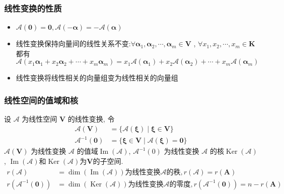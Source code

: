 \documentclass{article}
\begin{document}
			\subsubsection{线性变换的性质}
				\begin{itemize}
					\item $\mathscr{A}(\mathbf{0})=\mathbf{0}, \mathscr{A}(-\boldsymbol \alpha)=-\mathscr{A}(\boldsymbol{\alpha})$
					\item 线性变换保持向量间的线性关系不变:$\forall\boldsymbol{\alpha}_{1}, \boldsymbol{\alpha}_{2}, \cdots, \boldsymbol{\alpha}_{m} \in \boldsymbol V$ , $\forall x_{1}, x_{2}, \cdots, x_{m} \in \mathbf K$ 都有
					$$
					\mathscr{A}\left(x_{1} \boldsymbol{\alpha}_{1}+x_{2} \boldsymbol{\alpha}_{2}+\cdots+x_{m} \boldsymbol{\alpha}_{m}\right)=x_{1} \mathscr{A}\left(\boldsymbol{\alpha}_{1}\right)+x_{2} \mathscr{A}\left(\boldsymbol{\alpha}_{2}\right)+\cdots+x_{m} \mathscr{A}\left(\boldsymbol{\alpha}_{m}\right)
					$$
					\item 线性变换将线性相关的向量组变为线性相关的向量组
				\end{itemize}
			\subsubsection{线性空间的值域和核}
				设 $\mathscr{A}$ 为线性空间 $\boldsymbol V$ 的线性变换, 令
				$$
				\begin{aligned}
					\mathscr{A}(\boldsymbol V) &=\{\mathscr{A}(\boldsymbol \xi) \mid \boldsymbol \xi \in \boldsymbol V\}\\
					\mathscr{A}^{-1}(\mathbf{0}) &=\{\boldsymbol{\xi} \in \boldsymbol V \mid \mathscr{A}(\boldsymbol{\xi})=\mathbf{0}\}
				\end{aligned}
				$$
				$\mathscr{A}(\boldsymbol V)$ 为线性变换 $\mathscr{A}$ 的值域$\operatorname{Im}(\mathscr{A})$, $\mathscr{A}^{-1}(0)$ 为线性变换 $\mathscr{A}$ 的核$\operatorname{Ker}(\mathscr{A})$, $\operatorname{Im}(\mathscr{A})$和$\operatorname{Ker}(\mathscr{A})$为$\boldsymbol V$的子空间.
				$$
				\begin{aligned}
					r(\mathscr{A}) &=\operatorname{dim}(\operatorname{Im}(\mathscr{A}))\text{为线性变换} \mathscr{A} \text{的秩}, r(\mathscr{A})=r(\boldsymbol{A}) \\
					r\left(\mathscr{A}^{-1}(\mathbf{0})\right) &=\operatorname{dim}(\operatorname{Ker}(\mathscr{A}))\text{为线性变换} \mathscr{A} \text{的零度}, r\left(\mathscr{A}^{-1}(\mathbf{0})\right)=n-r(\boldsymbol{A})
				\end{aligned}
				$$
\end{document}
